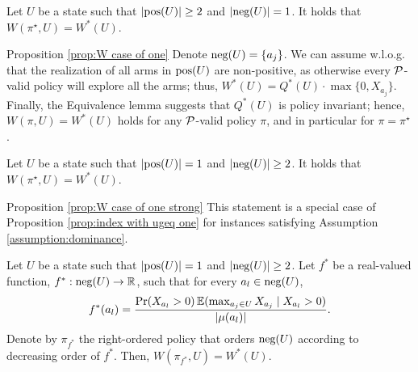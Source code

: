 \begin{proposition}\label{prop:W case of one}
Let $U$ be a state such that $\left| \textnormal{pos}(U) \right|\geq 2$ and $\left| \textnormal{neg}(U) \right| =1$. 
It holds that $W(\pi^\star,U)=W^*(U)$.
\end{proposition}
\begin{proofof}{Proposition \ref{prop:W case of one}}
Denote $\textnormal{neg}(U)=\{a_{j}\}$. We can assume w.l.o.g. that the realization of all arms in $\textnormal{pos}(U)$ are non-positive, as otherwise every $\mathcal{P}$-valid policy will explore all the arms; thus, $W^*(U)=Q^*(U)\cdot \max\{0, X_{a_{j}}  \}$. Finally, the Equivalence lemma suggests that   $Q^*(U)$ is policy invariant; hence, $W(\pi,U)=W^*(U)$ holds for any $\mathcal{P}$-valid policy $\pi$, and in particular for $\pi=\pi^\star$.
\end{proofof}

\begin{proposition}\label{prop:W case of one strong}
Let $U$ be a state such that $\left| \textnormal{pos}(U) \right|=1$ and $\left| \textnormal{neg}(U) \right| \geq 2$. It holds that $W(\pi^\star,U)=W^*(U)$.
\end{proposition}
\begin{proofof}{Proposition \ref{prop:W case of one strong}}
This statement is a special case of Proposition \ref{prop:index with ugeq one} for instances satisfying Assumption \ref{assumption:dominance}.
\end{proofof}
\begin{proposition}\label{prop:index with ugeq one}
Let $U$ be a state such that $\left| \textnormal{pos}(U) \right|=1$ and $\left| \textnormal{neg}(U) \right| \geq 2$. Let $f^*$ be a real-valued function, $f^*:\textnormal{neg}(U)\rightarrow \mathbb R$, such that for every $a_l \in \textnormal{neg}(U)$,
\[
f^*(a_{l})=\frac{\Pr(X_{a_l} > 0 )\operatorname{\mathbb{E}}(\max_{a_j \in {U} } X_{a_j}\mid X_{a_l}>0 )}{\left| \mu(a_l) \right|}.
\]  
Denote by $\pi_{f^*}$ the right-ordered policy that orders $\textnormal{neg}(U)$ according to decreasing order of $f^*$. Then, $W(\pi_{f^*},U)=W^*(U)$. 
\end{proposition}

